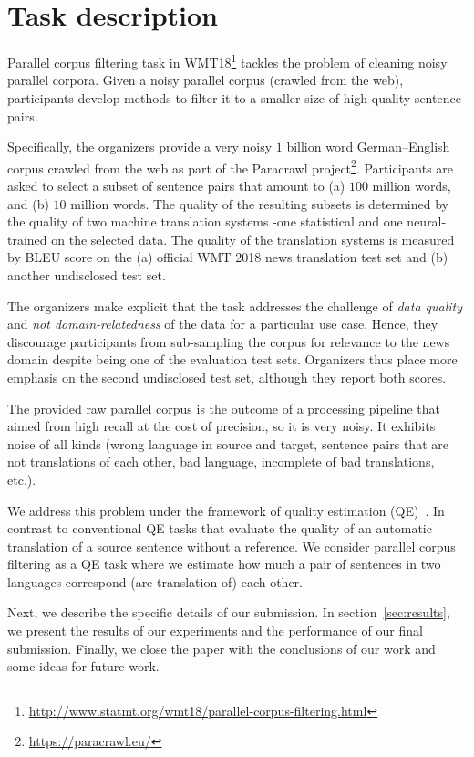 \section{Task description}

Parallel corpus filtering task in WMT18\footnote{\url{http://www.statmt.org/wmt18/parallel-corpus-filtering.html}} tackles the problem of cleaning noisy parallel corpora. Given a noisy parallel corpus (crawled from the web), participants develop methods to filter it to a smaller size of high quality sentence pairs.

Specifically, the organizers provide a very noisy $1$ billion word German--English corpus crawled from the web as part of the Paracrawl project\footnote{\url{https://paracrawl.eu/}}. Participants are asked to select a subset of sentence pairs that amount to (a) $100$ million words, and (b) $10$ million words. The quality of the resulting subsets is determined by the quality of two machine translation systems -one statistical and one neural- trained on the selected data. The quality of the translation systems is measured by BLEU score on the (a) official WMT 2018 news translation test set and (b) another undisclosed test set.

The organizers make explicit that the task addresses the challenge of \emph{data quality} and \emph{not domain-relatedness} of the data for a particular use case. Hence, they discourage participants from sub-sampling the corpus for relevance to the news domain despite being one of the evaluation test sets. Organizers thus place more emphasis on the second undisclosed test set, although they report both scores.

The provided raw parallel corpus is the outcome of a processing pipeline that aimed from high recall at the cost of precision, so it is very noisy. It exhibits noise of all kinds (wrong language in source and target, sentence pairs that are not translations of each other, bad language, incomplete of bad translations, etc.).

We address this problem under the framework of quality estimation (QE)~\cite{Blatz04}. In contrast to conventional QE tasks that evaluate the quality of an automatic translation of a source sentence without a reference. We consider parallel corpus filtering as a QE task where we estimate how much a pair of sentences in two languages correspond (are translation of) each other. 

Next, we describe the specific details of our submission. In section~\ref{sec:results}, we present the results of our experiments and the performance of our final submission. Finally, we close the paper with the conclusions of our work and some ideas for future work.
